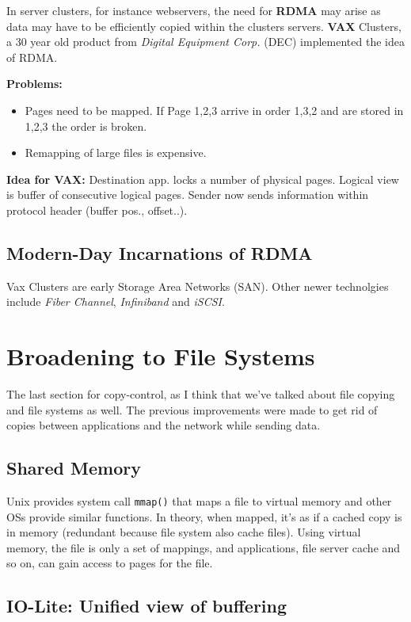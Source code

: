 In server clusters, for instance webservers, the need for \textbf{RDMA} may arise as data may have to be efficiently copied within the clusters servers. \textbf{VAX} Clusters, a 30 year old product from \textit{Digital Equipment Corp.} (DEC) implemented the idea of RDMA.

\textbf{Problems:} \begin{itemize}
    \item Pages need to be mapped. If Page 1,2,3 arrive in order 1,3,2 and are stored in 1,2,3 the order is broken.
    \item Remapping of large files is expensive.
\end{itemize}

\textbf{Idea for VAX:} Destination app. locks a number of physical pages. Logical view is buffer of consecutive logical pages. Sender now sends information within protocol header (buffer pos., offset..).

\subsection{Modern-Day Incarnations of RDMA}

Vax Clusters are early Storage Area Networks (SAN). Other newer technolgies include \textit{Fiber Channel}, \textit{Infiniband} and \textit{iSCSI}.

\section{Broadening to File Systems}

The last section for copy-control, as I think that we've talked about file copying and file systems as well.
The previous improvements were made to get rid of copies between applications and the network while sending data.

\subsection{Shared Memory} Unix provides system call \texttt{mmap()} that maps a file to virtual memory and other OSs provide similar functions. In theory, when mapped, it's as if a cached copy is in memory (redundant because file system also cache files). Using virtual memory, the file is only a set of mappings, and applications, file server cache and so on, can gain access to pages for the file.

\subsection{IO-Lite: Unified view of buffering}

